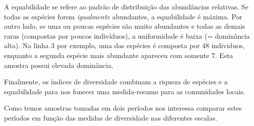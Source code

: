 \documentclass[
]{book}
\begin{document}
A equabilidade se refere ao padrão de distribuição das abundâncias relativas. Se todas as espécies forem \emph{igualmente} abundantes, a equabilidade é máxima. Por outro lado, se uma ou poucas espécies são muito abundantes e todas as demais raras (compostas por poucos indivíduos), a uniformidade é baixa (= dominância alta). Na linha \(3\) por exemplo, uma das espécies é composta por \(48\) individuos, enquanto a segunda espécie mais abundante apareceu com somente \(7\). Esta amostra possui elevada dominância.

Finalmente, os índices de diversidade combinam a riqueza de espécies e a equabilidade para nos fonecer uma medida-resumo para as comunidades locais.

Como temos amostras tomadas em dois períodos nos interessa comparar estes períodos em função das medidas de diversidade nas diferentes escalas.
\end{document}
